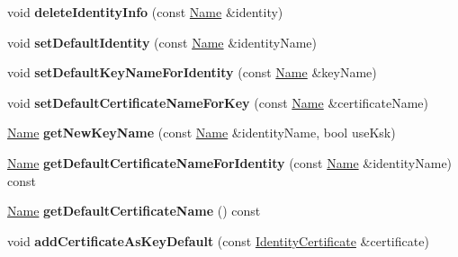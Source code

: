 \begin{DoxyCompactItemize}
\item 
void {\bfseries delete\+Identity\+Info} (const \hyperlink{classndn_1_1Name}{Name} \&identity)\hypertarget{classndn_1_1security_1_1KeyChain_ac8457929c7db8cea47c09148527dcafd}{}\label{classndn_1_1security_1_1KeyChain_ac8457929c7db8cea47c09148527dcafd}

\item 
void {\bfseries set\+Default\+Identity} (const \hyperlink{classndn_1_1Name}{Name} \&identity\+Name)\hypertarget{classndn_1_1security_1_1KeyChain_aefa5601936f7655a839e89d461a79dc5}{}\label{classndn_1_1security_1_1KeyChain_aefa5601936f7655a839e89d461a79dc5}

\item 
void {\bfseries set\+Default\+Key\+Name\+For\+Identity} (const \hyperlink{classndn_1_1Name}{Name} \&key\+Name)\hypertarget{classndn_1_1security_1_1KeyChain_a3a8839341e38ccf4bd8b0c73590a964f}{}\label{classndn_1_1security_1_1KeyChain_a3a8839341e38ccf4bd8b0c73590a964f}

\item 
void {\bfseries set\+Default\+Certificate\+Name\+For\+Key} (const \hyperlink{classndn_1_1Name}{Name} \&certificate\+Name)\hypertarget{classndn_1_1security_1_1KeyChain_a8c33a5ea8893954066a49f8a84e06fff}{}\label{classndn_1_1security_1_1KeyChain_a8c33a5ea8893954066a49f8a84e06fff}

\item 
\hyperlink{classndn_1_1Name}{Name} {\bfseries get\+New\+Key\+Name} (const \hyperlink{classndn_1_1Name}{Name} \&identity\+Name, bool use\+Ksk)\hypertarget{classndn_1_1security_1_1KeyChain_a945c44be63ad17420b6e35e17f616080}{}\label{classndn_1_1security_1_1KeyChain_a945c44be63ad17420b6e35e17f616080}

\item 
\hyperlink{classndn_1_1Name}{Name} {\bfseries get\+Default\+Certificate\+Name\+For\+Identity} (const \hyperlink{classndn_1_1Name}{Name} \&identity\+Name) const\hypertarget{classndn_1_1security_1_1KeyChain_a1745ad8ff868b7c5cc5bf862030a477b}{}\label{classndn_1_1security_1_1KeyChain_a1745ad8ff868b7c5cc5bf862030a477b}

\item 
\hyperlink{classndn_1_1Name}{Name} {\bfseries get\+Default\+Certificate\+Name} () const\hypertarget{classndn_1_1security_1_1KeyChain_aecded83515c49e7f4c44690375a34169}{}\label{classndn_1_1security_1_1KeyChain_aecded83515c49e7f4c44690375a34169}

\item 
void {\bfseries add\+Certificate\+As\+Key\+Default} (const \hyperlink{classndn_1_1IdentityCertificate}{Identity\+Certificate} \&certificate)\hypertarget{classndn_1_1security_1_1KeyChain_a9a3f955f5d329306eaed8b28d8ffdaaf}{}\label{classndn_1_1security_1_1KeyChain_a9a3f955f5d329306eaed8b28d8ffdaaf}


\end{DoxyCompactItemize}
